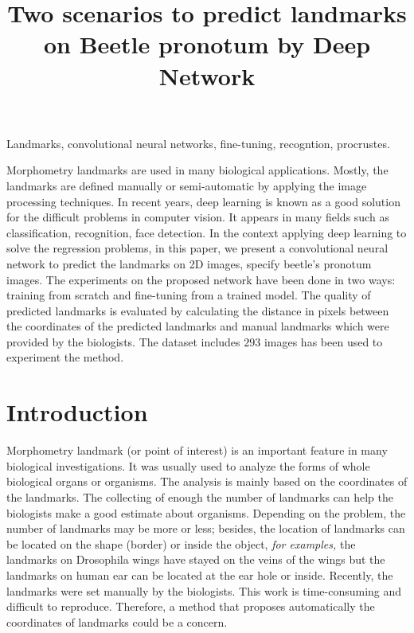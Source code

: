 \documentclass[10pt]{article}
\begin{document}
\noindent



\title{Two scenarios to predict landmarks on Beetle pronotum by Deep Network}




\maketitle

\keywords
Landmarks, convolutional neural networks, fine-tuning, recogntion, procrustes.

\abstract
Morphometry landmarks are used in many biological applications. Mostly, the landmarks are defined manually or semi-automatic by applying the image processing techniques. In recent years, deep learning is known as a good solution for the difficult problems in computer vision. It appears in many fields such as classification, recognition, face detection. In the context applying deep learning to solve the regression problems, in this paper, we present a convolutional neural network to predict the landmarks on 2D images, specify beetle's pronotum images. The experiments on the proposed network have been done in two ways: training from scratch and fine-tuning from a trained model. The quality of predicted landmarks is evaluated by calculating the distance in pixels between the coordinates of the predicted landmarks and manual landmarks which were provided by the biologists. The dataset includes $293$ images has been used to experiment the method.

\section{Introduction}
Morphometry landmark (or point of interest) is an important feature in many biological investigations. It was usually used to analyze the forms of whole biological organs or organisms. The analysis is mainly based on the coordinates of the landmarks. The collecting of enough the number of landmarks can help the biologists make a good estimate about organisms. Depending on the problem, the number of landmarks may be more or less; besides, the location of landmarks can be located on the shape (border) or inside the object, \textit{for examples,} the landmarks on Drosophila wings have stayed on the veins of the wings but the landmarks on human ear can be located at the ear hole or inside. Recently, the landmarks were set manually by the biologists. This work is time-consuming and difficult to reproduce. Therefore, a method that proposes automatically the coordinates of landmarks could be a concern. 
\end{document}
